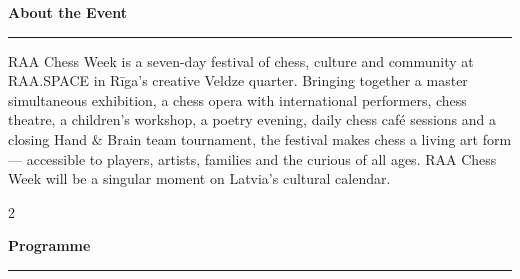\documentclass[a4paper,10pt]{article}
\newcommand{\sectionrule}[1]{%
  \vspace{5pt}%
  {\color{raared}\bfseries\large #1}\\[-3pt]%
  {\color{raared}\rule{\linewidth}{0.8pt}}%
  \vspace{3pt}%
}
\begin{document}
\begin{center}
\begin{minipage}{0.87\paperwidth}

\vspace{0.38cm}

\sectionrule{About the Event}

RAA Chess Week is a seven-day festival of chess, culture and community at RAA.SPACE in Rīga's creative Veldze quarter. Bringing together a master simultaneous exhibition, a chess opera with international performers, chess theatre, a children's workshop, a poetry evening, daily chess café sessions and a closing Hand \& Brain team tournament, the festival makes chess a living art form — accessible to players, artists, families and the curious of all ages. RAA Chess Week will be a singular moment on Latvia's cultural calendar.

\vspace{0.22cm}

\begin{multicols}{2}

\sectionrule{Programme}


\end{multicols}
\end{minipage}
\end{center}
\end{document}
